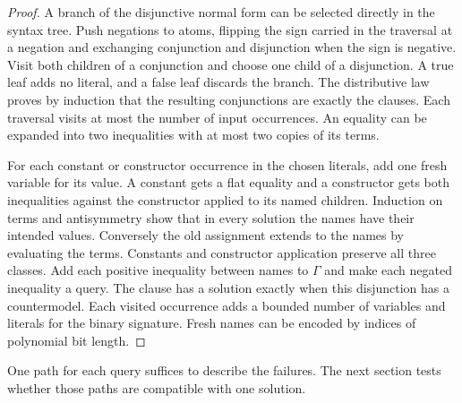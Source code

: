 \begin{proof}
A branch of the disjunctive normal form can be selected directly in the
syntax tree. Push negations to atoms, flipping the sign carried in the
traversal at a negation and exchanging conjunction and disjunction when the
sign is negative. Visit both children of a conjunction and choose one child
of a disjunction. A true leaf adds no literal, and a false leaf discards the
branch. The distributive law proves by induction that the resulting
conjunctions are exactly the clauses. Each traversal visits at most the
number of input occurrences. An equality can be expanded into two
inequalities with at most two copies of its terms.

For each constant or constructor occurrence in the chosen literals, add one
fresh variable for its value. A constant gets a flat equality and a
constructor gets both inequalities against the constructor applied to its
named children. Induction on terms and antisymmetry show that in every
solution the names have their intended values. Conversely the old
assignment extends to the names by evaluating the terms. Constants and
constructor application preserve all three classes. Add each positive
inequality between names to $\Gamma$ and make each negated inequality a
query. The clause has a solution exactly when this disjunction has a
countermodel. Each visited occurrence adds a bounded number of variables
and literals for the binary signature. Fresh names can be encoded by
indices of polynomial bit length.
\end{proof}

One path for each query suffices to describe the failures. The next section
tests whether those paths are compatible with one solution.
